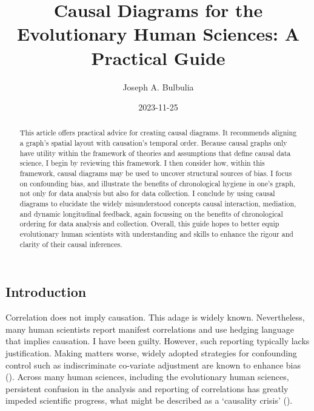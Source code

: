 \documentclass[
  singlecolumn,
  9pt]{article}
\title{Causal Diagrams for the Evolutionary Human Sciences: A Practical
Guide}
\author{Joseph A. Bulbulia}
\affil{%
                  Victoria University of Wellington, New Zealand, School
                  of Psychology, Centre for Applied Cross-Cultural
                  Research
              }
\date{2023-11-25}
\begin{document}
\maketitle
\begin{abstract}
This article offers practical advice for creating causal diagrams. It
recommends aligning a graph's spatial layout with causation's temporal
order. Because causal graphs only have utility within the framework of
theories and assumptions that define causal data science, I begin by
reviewing this framework. I then consider how, within this framework,
causal diagrams may be used to uncover structural sources of bias. I
focus on confounding bias, and illustrate the benefits of chronological
hygiene in one's graph, not only for data analysis but also for data
collection. I conclude by using causal diagrams to elucidate the widely
misunderstood concepts causal interaction, mediation, and dynamic
longitudinal feedback, again focussing on the benefits of chronological
ordering for data analysis and collection. Overall, this guide hopes to
better equip evolutionary human scientists with understanding and skills
to enhance the rigour and clarity of their causal inferences.
\end{abstract}
\subsection{Introduction}\label{introduction}

Correlation does not imply causation. This adage is widely known.
Nevertheless, many human scientists report manifest correlations and use
hedging language that implies causation. I have been guilty. However,
such reporting typically lacks justification. Making matters worse,
widely adopted strategies for confounding control such as indiscriminate
co-variate adjustment are known to enhance bias
(). Across many human
sciences, including the evolutionary human sciences, persistent
confusion in the analysis and reporting of correlations has greatly
impeded scientific progress, what might be described as a `causality
crisis' ().
\end{document}
